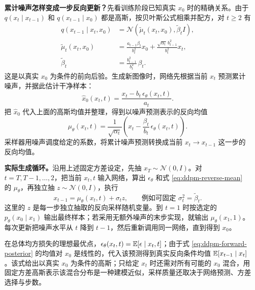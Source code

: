 \textbf{累计噪声怎样变成一步反向更新？}先看训练阶段已知真实 \(x_0\) 时的精确关系。由于 \(q(x_t\mid x_{t-1})\) 和 \(q(x_{t-1}\mid x_0)\) 都是高斯，按贝叶斯公式相乘并配方，对 \(t\geq2\) 有
\begin{equation}
\begin{aligned}
 q(x_{t-1}\mid x_t,x_0)
 &=\mathcal N\!\left(\widetilde\mu_t(x_t,x_0),\widetilde\beta_tI\right),\\
 \widetilde\mu_t(x_t,x_0)
 &=\frac{a_{t-1}\beta_t}{b_t^2}x_0
  +\frac{\sqrt{\alpha_t}\,b_{t-1}^2}{b_t^2}x_t,\\
 \widetilde\beta_t&=\frac{b_{t-1}^2}{b_t^2}\,\beta_t.
\end{aligned}
 \label{eq:ddpm-forward-posterior}
\end{equation}
这是以真实 \(x_0\) 为条件的前向后验。生成新图像时，网络先根据当前 \(x_t\) 预测累计噪声，并据此估计干净样本：
\begin{equation}
 \widehat x_0(x_t,t)=\frac{x_t-b_t\,\epsilon_\theta(x_t,t)}{a_t}.
\end{equation}
把 \(\widehat x_0\) 代入上面的高斯均值并整理，得到以噪声预测表示的反向均值
\begin{equation}
 \mu_\theta(x_t,t)=\frac{1}{\sqrt{\alpha_t}}\left(x_t-\frac{\beta_t}{b_t}\,\epsilon_\theta(x_t,t)\right).
 \label{eq:ddpm-reverse-mean}
\end{equation}
采样器用噪声调度给定的系数，将累计噪声预测转换成当前 \(x_t\to x_{t-1}\) 这一步的反向均值。

\textbf{实际生成循环。}沿用上述固定方差设定，先抽 \(x_T\sim\mathcal N(0,I)\)。对 \(t=T,T-1,\ldots,2\)，把当前 \(x_t,t\) 输入网络，算出 \(\epsilon_\theta\) 和式 \eqref{eq:ddpm-reverse-mean} 的 \(\mu_\theta\)，再独立抽 \(z\sim\mathcal N(0,I)\)，执行
\begin{equation}
 x_{t-1}=\mu_\theta(x_t,t)+\sigma_tz,
 \qquad \text{例如可固定 }\sigma_t^2=\widetilde\beta_t.
 \label{eq:ddpm-sampling-step}
\end{equation}
这里的 \(z\) 是每一步独立抽取的反向采样随机变量。到 \(t=1\) 时按选定的 \(p_\theta(x_0\mid x_1)\) 输出最终样本；若采用无额外噪声的末步实现，就输出 \(\mu_\theta(x_1,1)\)。每次更新把噪声水平从 \(t\) 降到 \(t-1\)，然后重新调用同一网络，直到得到 \(x_0\)。

在总体均方损失的理想最优点，\(\epsilon_\theta(x_t,t)=\mathbb{E}[\epsilon\mid x_t,t]\)；由于式 \eqref{eq:ddpm-forward-posterior} 的均值对 \(x_0\) 是线性的，代入该预测得到真实反向条件均值 \(\mathbb{E}[x_{t-1}\mid x_t]\)。该式给出以真实 \(x_0\) 为条件的高斯；只给定 \(x_t\) 时还需对所有可能的 \(x_0\) 混合，用固定方差高斯表示该混合分布是一种建模近似，采样质量还取决于网络预测、方差选择与步数。

